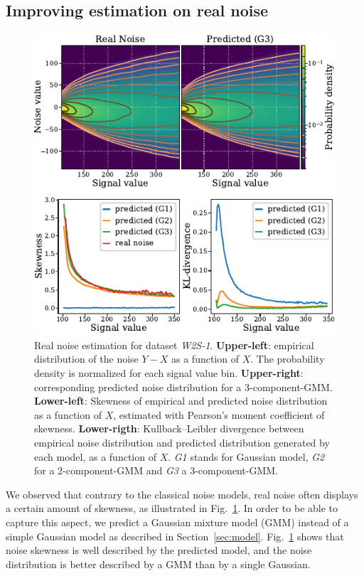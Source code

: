 \documentclass{article}
\begin{document}
\subsection{Improving estimation on real noise}
\begin{figure}[ht]
\begin{center}
\centerline{\includegraphics[width=\columnwidth]{fig_skewness.pdf}}
\caption{Real noise estimation for dataset \textit{W2S-1}. \textbf{Upper-left}: empirical distribution of the noise $Y - X$ as a function of $X$.
The probability density is normalized for each signal value bin.
\textbf{Upper-right}: corresponding predicted noise distribution for a 3-component-GMM.
\textbf{Lower-left}: Skewness of empirical and predicted noise distribution as a function of $X$, estimated with Pearson's moment coefficient of skewness\protect\footnotemark.
\textbf{Lower-rigth}:  Kullback–Leibler divergence between empirical noise distribution and predicted distribution generated by each model, as a function of $X$.
\textit{G1} stands for Gaussian model, \textit{G2} for a 2-component-GMM and \textit{G3} a 3-component-GMM.
}
\label{fig:skewness}
\end{center}
\vskip -0.2in
\end{figure}
We observed that contrary to the classical noise models, real noise often displays a certain amount of skewness, as illustrated in Fig.~\ref{fig:skewness}.
In order to be able to capture this aspect, we predict a Gaussian mixture model (GMM) instead of a simple Gaussian model as described in Section~\ref{sec:model}. Fig.~\ref{fig:skewness} shows that noise skewness is well described by the predicted model, and the noise distribution is better described by a GMM than by a single Gaussian.
\end{document}
